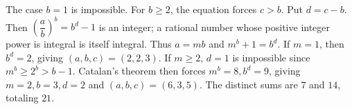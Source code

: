 The case $b=1$ is impossible. For $b\ge2$, the equation forces $c>b$. Put $d=c-b$. Then $(\dfrac{a}{b})^b=b^d-1$ is an integer; a rational number whose positive integer power is integral is itself integral. Thus $a=mb$ and $m^b+1=b^d$.
If $m=1$, then $b^d=2$, giving $(a,b,c)=(2,2,3)$. If $m\ge2$, $d=1$ is impossible since $m^b\ge2^b>b-1$. Catalan's theorem then forces $m^b=8,b^d=9$, giving $m=2,b=3,d=2$ and $(a,b,c)=(6,3,5)$. The distinct sums are $7$ and $14$, totaling $\boxed{21}$.
